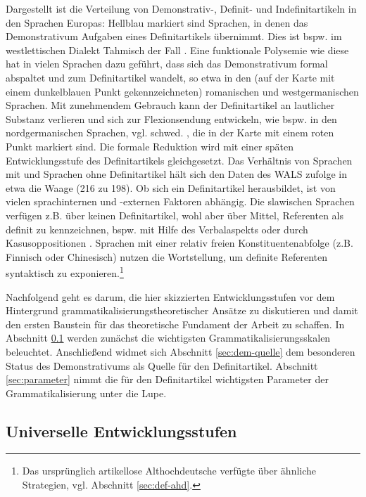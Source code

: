 Dargestellt ist die Verteilung von Demonstrativ-, Definit- und Indefinitartikeln in den Sprachen Europas: Hellblau markiert sind Sprachen, in denen das Demonstrativum Aufgaben eines Definitartikels übernimmt. Dies ist bspw. im westlettischen Dialekt Tahmisch der Fall \parencite[573--574]{Schroeder2006}.
Eine funktionale Polysemie wie diese hat in vielen Sprachen dazu geführt, dass sich das Demonstrativum formal abspaltet und zum  Definitartikel wandelt, so etwa in den (auf der Karte mit einem dunkelblauen Punkt gekennzeichneten) romanischen und westgermanischen Sprachen. Mit zunehmendem Gebrauch kann der Definitartikel an lautlicher Substanz 
verlieren und sich zur Flexionsendung entwickeln, wie bspw. in den  nordgermanischen Sprachen, vgl. schwed.  , die in der Karte mit einem roten Punkt markiert sind.  Die formale Reduktion wird mit einer späten Entwicklungsstufe des Definitartikels gleichgesetzt. Das Verhältnis von Sprachen mit und Sprachen ohne Definitartikel hält sich den Daten des WALS zufolge \parencite[Kapitel 37]{Dryer2013} in etwa die Waage (216 zu 198). Ob sich ein Definitartikel herausbildet, ist von vielen sprachinternen und -externen Faktoren abhängig. Die slawischen Sprachen verfügen z.B. über keinen Definitartikel, wohl aber über Mittel, Referenten als definit zu kennzeichnen, bspw. mit Hilfe des Verbalaspekts oder durch Kasusoppositionen \parencite{Hauenschild1993,Leiss2000}. Sprachen mit einer relativ freien Konstituentenabfolge (z.B. Finnisch oder Chinesisch) nutzen die Wortstellung, um definite Referenten syntaktisch zu exponieren.\footnote{
Das ursprünglich artikellose Althochdeutsche verfügte über ähnliche Strategien, vgl. Abschnitt \ref{sec:def-ahd}.}

Nachfolgend geht es darum, die hier skizzierten Entwicklungsstufen vor dem Hintergrund grammatikalisierungstheoretischer Ansätze zu diskutieren und damit den ersten Baustein für das theoretische Fundament der Arbeit zu schaffen. 
In Abschnitt \ref{sec:stufen} werden zunächst die wichtigsten Grammatikalisierungsskalen beleuchtet.  
Anschließend widmet sich Abschnitt \ref{sec:dem-quelle} dem besonderen Status des Demonstrativums als Quelle für den Definitartikel. Abschnitt \ref{sec:parameter} nimmt die für den Definitartikel wichtigsten Parameter der Grammatikalisierung unter die Lupe. 


\subsection{Universelle Entwicklungsstufen}\label{sec:stufen}

